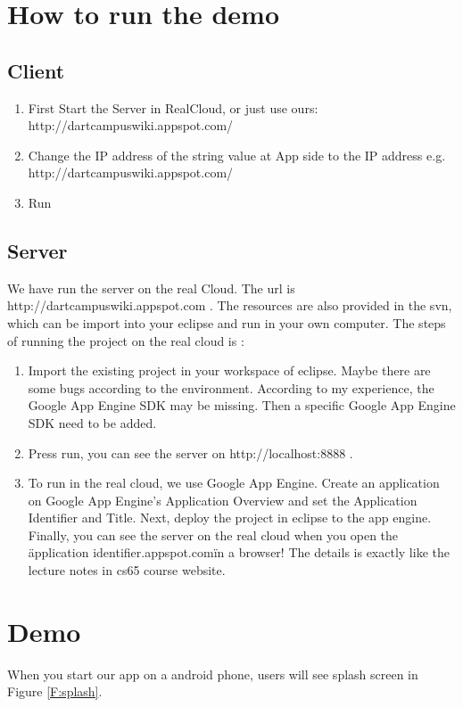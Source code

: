 \documentclass{article}
\begin{document}
\section{How to run the demo}
\subsection{Client}

\begin{enumerate}
\item
First Start the Server in RealCloud, or just use ours: http://dartcampuswiki.appspot.com/

\item
Change the IP address of the string value at App side to the IP address e.g. http://dartcampuswiki.appspot.com/

\item
Run
\end{enumerate}


\subsection{Server}
We have run the server on the real Cloud. The url is http://dartcampuswiki.appspot.com . 
The resources are also provided in the svn, which can be import into your eclipse and run in your own computer. The steps of running the project on the real cloud is :
\begin{enumerate}
\item 
Import the existing project in your workspace of eclipse. Maybe there are some bugs according to the environment. According to my experience, the Google App Engine SDK may be missing. Then a specific Google App Engine SDK need to be added.

\item
Press run, you can see the server on http://localhost:8888 .

\item
To run in the real cloud, we use Google App Engine. Create an application on Google App Engine's Application Overview and set the Application Identifier and Title. Next, deploy the project in eclipse to the app engine. Finally, you can see the server on the real cloud when you open the \"application identifier.appspot.com\" in a browser! The details is exactly like the lecture notes in cs65 course website.

\end{enumerate}

\section{Demo}
When you start our app on a android phone, users will see splash screen in Figure \ref{F:splash}.
\end{document}
